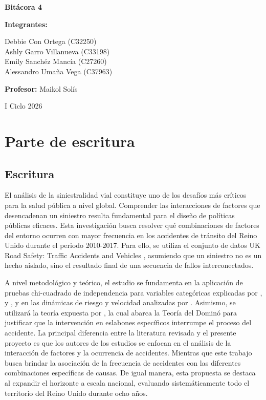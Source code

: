 \documentclass[12pt]{article}
\begin{document}
\begin{titlepage}
\centering
\vspace*{\fill}

{\Huge\bfseries Bitácora 4\par}
\vspace{1.5cm}

{\Large\textbf{Integrantes:}\par}
Debbie Con Ortega (C32250)\\
Ashly Garro Villanueva (C33198)\\
Emily Sanchéz Mancía (C27260)\\
Alessandro Umaña Vega (C37963)

\vspace{1cm}

{\Large\textbf{Profesor:} Maikol Solís\par}
\vspace{1.5cm}

{\Large I Ciclo 2026\par}

\vspace*{\fill}
\end{titlepage}
\tableofcontents
\newpage
\section{Parte de escritura}
\subsection{Escritura}
El análisis de la siniestralidad vial constituye uno de los desafíos más críticos 
para la salud pública a nivel global. Comprender las interacciones de factores que 
desencadenan un siniestro resulta fundamental para el diseño de políticas públicas 
eficaces. Esta investigación busca resolver qué combinaciones de factores del entorno 
ocurren con mayor frecuencia en los accidentes de tránsito del Reino Unido durante el 
periodo 2010-2017. Para ello, se utiliza el conjunto de datos UK Road Safety: Traffic 
Accidents and Vehicles , asumiendo que un siniestro no es un hecho aislado, sino el resultado 
final de una secuencia de fallos interconectados.

A nivel metodológico y teórico, el estudio se fundamenta en la aplicación de pruebas 
chi-cuadrado de independencia para variables categóricas explicadas por \textcite{McHugh2013}, \textcite{LASTRE2019} y \textcite{Agresti2002},
y en las dinámicas de riesgo y velocidad analizadas por \textcite{TAYLOR2000}. 
Asimismo, se utilizará la teoría expuesta por \textcite{SAXENA2017}, la cual abarca la 
Teoría del Dominó para justificar que la intervención en eslabones específicos interrumpe 
el proceso del accidente. La principal diferencia entre la literatura revisada y el presente 
proyecto es que los autores de los estudios se enfocan en el análisis de la interacción de 
factores y la ocurrencia de accidentes. Mientras que este trabajo busca brindar la asociación 
de la frecuencia de accidentes con las diferentes combinaciones específicas de causas. 
De igual manera, esta propuesta se destaca al expandir el horizonte a escala nacional, 
evaluando sistemáticamente todo el territorio del Reino Unido durante ocho años.
\end{document}
